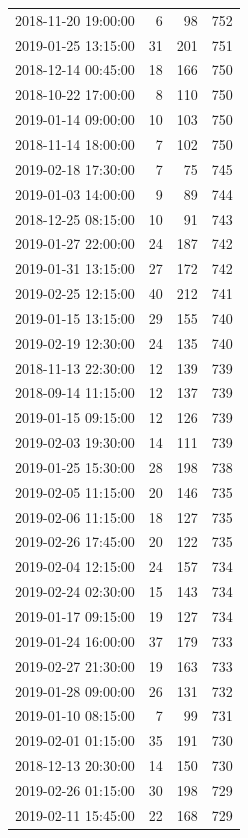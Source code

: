 \begin{tabular}{lrrr}
2018-11-20 19:00:00 & 6 & 98 & 752 \\
2019-01-25 13:15:00 & 31 & 201 & 751 \\
2018-12-14 00:45:00 & 18 & 166 & 750 \\
2018-10-22 17:00:00 & 8 & 110 & 750 \\
2019-01-14 09:00:00 & 10 & 103 & 750 \\
2018-11-14 18:00:00 & 7 & 102 & 750 \\
2019-02-18 17:30:00 & 7 & 75 & 745 \\
2019-01-03 14:00:00 & 9 & 89 & 744 \\
2018-12-25 08:15:00 & 10 & 91 & 743 \\
2019-01-27 22:00:00 & 24 & 187 & 742 \\
2019-01-31 13:15:00 & 27 & 172 & 742 \\
2019-02-25 12:15:00 & 40 & 212 & 741 \\
2019-01-15 13:15:00 & 29 & 155 & 740 \\
2019-02-19 12:30:00 & 24 & 135 & 740 \\
2018-11-13 22:30:00 & 12 & 139 & 739 \\
2018-09-14 11:15:00 & 12 & 137 & 739 \\
2019-01-15 09:15:00 & 12 & 126 & 739 \\
2019-02-03 19:30:00 & 14 & 111 & 739 \\
2019-01-25 15:30:00 & 28 & 198 & 738 \\
2019-02-05 11:15:00 & 20 & 146 & 735 \\
2019-02-06 11:15:00 & 18 & 127 & 735 \\
2019-02-26 17:45:00 & 20 & 122 & 735 \\
2019-02-04 12:15:00 & 24 & 157 & 734 \\
2019-02-24 02:30:00 & 15 & 143 & 734 \\
2019-01-17 09:15:00 & 19 & 127 & 734 \\
2019-01-24 16:00:00 & 37 & 179 & 733 \\
2019-02-27 21:30:00 & 19 & 163 & 733 \\
2019-01-28 09:00:00 & 26 & 131 & 732 \\
2019-01-10 08:15:00 & 7 & 99 & 731 \\
2019-02-01 01:15:00 & 35 & 191 & 730 \\
2018-12-13 20:30:00 & 14 & 150 & 730 \\
2019-02-26 01:15:00 & 30 & 198 & 729 \\
2019-02-11 15:45:00 & 22 & 168 & 729 \\

\end{tabular}

